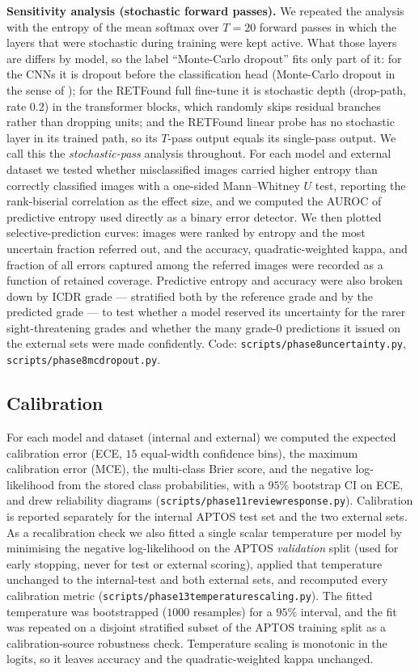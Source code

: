 \documentclass[journal]{IEEEtran}
\renewcommand{\_}{\origunderscore\allowbreak}
\begin{document}
\textbf{Sensitivity analysis (stochastic forward passes).} We repeated the
analysis with the entropy of the mean softmax over $T=20$ forward passes in
which the layers that were stochastic during training were kept active. What
those layers are differs by model, so the label ``Monte-Carlo dropout'' fits
only part of it: for the CNNs it is dropout before the classification head
(Monte-Carlo dropout in the sense of \cite{gal2016dropout}); for the RETFound
full fine-tune it is stochastic depth (drop-path, rate $0.2$) in the
transformer blocks, which randomly skips residual branches rather than dropping
units; and the RETFound linear probe has no stochastic layer in its trained
path, so its $T$-pass output equals its single-pass output. We call this the
\emph{stochastic-pass} analysis throughout. For
each model and external dataset we tested whether misclassified images carried
higher entropy than correctly classified images with a one-sided Mann--Whitney
$U$ test, reporting the rank-biserial correlation as the effect size, and we
computed the AUROC of predictive entropy used directly as a binary error
detector. We then plotted selective-prediction curves: images were ranked by
entropy and the most uncertain fraction referred out, and the accuracy,
quadratic-weighted kappa, and fraction of all errors captured among the referred
images were recorded as a function of retained coverage. Predictive entropy and
accuracy were also broken down by ICDR grade --- stratified both by the reference
grade and by the predicted grade --- to test whether a model reserved its
uncertainty for the rarer sight-threatening grades and whether the many grade-0
predictions it issued on the external sets were made confidently. Code:
\texttt{scripts/\allowbreak{}phase8\_uncertainty.py}, \texttt{scripts/\allowbreak{}phase8\_mc\_dropout.py}.

\subsection{Calibration}
\label{sec:methods-calib}

For each model and dataset (internal and external) we computed the expected
calibration error (ECE, $15$ equal-width confidence bins), the maximum
calibration error (MCE), the multi-class Brier score, and the negative
log-likelihood from the stored class probabilities, with a $95\%$ bootstrap CI on
ECE, and drew reliability diagrams
(\texttt{scripts/\allowbreak{}phase11\_review\_response.py}). Calibration is reported
separately for the internal APTOS test set and the two external sets. As a
recalibration check we also fitted a single scalar temperature per model by
minimising the negative log-likelihood on the APTOS \emph{validation} split
(used for early stopping, never for test or external scoring), applied that
temperature unchanged to the internal-test and both external sets, and recomputed
every calibration metric (\texttt{scripts/\allowbreak{}phase13\_temperature\_scaling.py}). The
fitted temperature was bootstrapped ($1000$ resamples) for a $95\%$ interval, and
the fit was repeated on a disjoint stratified subset of the APTOS training split
as a calibration-source robustness check. Temperature scaling is monotonic in the
logits, so it leaves accuracy and the quadratic-weighted kappa unchanged.
\end{document}

